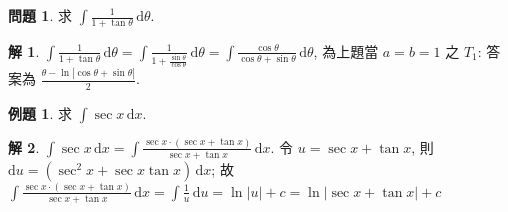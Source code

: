 \documentclass[12pt]{extarticle}
\newcommand{\ds}{\displaystyle}
\newcommand{\ie}{\;\Longrightarrow\;}
\theoremstyle{definition}
\newtheorem*{ex}{問題}
\newtheorem*{eg}{例題}
\newtheorem*{sol}{解}
\newcommand{\myline}{\noindent\makebox[\linewidth]{\rule{\paperwidth}{0.4pt}}}
\begin{document}
\myline

\begin{ex}
  求 $\ds\int\!\frac{1}{1 + \tan\theta}\,\text{d}\theta$.
\end{ex}

\begin{sol}
  $\ds\int\!\frac{1}{1 + \tan\theta}\,\text{d}\theta = \int\!\frac{1}{1 + \frac{\sin\theta}{\cos\theta}}\,\text{d}\theta = \int\!\frac{\cos\theta}{\cos\theta + \sin\theta}\,\text{d}\theta$, 為上題當 $a = b = 1$ 之 $T_1$: 答案為 $\ds\frac{\theta - \ln|\cos\theta + \sin\theta|}{2}$. 
\end{sol}

\myline

\begin{eg}
  求 $\ds\int\!\sec x\,\text{d}x$. 
\end{eg}

\begin{sol}
  $\ds\int\!\sec x\,\text{d}x = \int\!\frac{\sec x\cdot(\sec x + \tan x)}{\sec x + \tan x}\,\text{d}x$. 令 $u = \sec x + \tan x$, 則 $\ds\text{d}u = (\sec^2 x + \sec x\tan x)\,\text{d}x$; 故 $\ds\int\!\frac{\sec x\cdot(\sec x + \tan x)}{\sec x + \tan x}\,\text{d}x = \int\!\frac{1}{u}\,\text{d}u = \ln|u| + c = \ln|\sec x + \tan x| + c$
\end{sol}

%
\end{document}
